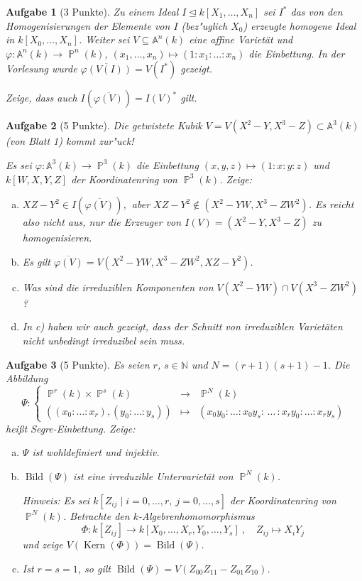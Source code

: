 \documentclass[a4paper, 12pt, numbers=noendperiod, chapterprefix=true]{scrbook}
\theoremstyle{break}
\newtheorem{Aufg}{Aufgabe}
\theoremstyle{nonumberbreak}
\theoremstyle{nonumberplain}
\DeclareMathOperator{\Bild}{Bild}
\DeclareMathOperator{\Kern}{Kern}
\newcommand{\N}{\mathbb{N}}
\newcommand{\A}{\mathbb{A}}
\newcommand{\Affine}{\mathbb{A}} %
\DeclareMathOperator{\Projective}{\mathbb{P}} %
\newcommand{\ideal}{\unlhd}
\begin{document}
\begin{Aufg}[3 Punkte]
Zu einem Ideal $I\ideal k[X_1,\dots,X_n]$ sei $I^*$ das von den Homogenisierungen der Elemente von $I$ (bez"uglich $X_0$) erzeugte homogene Ideal in $k[X_0,\dots,X_n]$. Weiter sei $V\subseteq \Affine^n(k)$ eine affine Variet\"at und $\varphi: \Affine^n(k)\to \Projective^n(k)$, $(x_1,\dots,x_n)\mapsto (1:x_1:\ldots:x_n)$ die Einbettung. In der Vorlesung wurde $\overline{\varphi(V(I))} = V(I^*)$ gezeigt.

Zeige, dass auch $I(\overline{\varphi(V)}) = I(V)^*$ gilt.
\end{Aufg}

\begin{Aufg}[5 Punkte]
Die getwistete Kubik $V = V(X^2-Y, X^3-Z) \subset \Affine^3(k)$ (von Blatt 1) kommt zur"uck! 

Es sei $\varphi: \Affine^3(k)\to \Projective^3(k)$ die Einbettung $(x,y,z)\mapsto (1:x:y:z)$ und $k[W,X,Y,Z]$ der Koordinatenring von $\Projective^3(k)$. Zeige:
\begin{enumerate}[a)]
	\item $XZ-Y^2 \in I(\overline{\varphi(V)})$,$\ $ aber $XZ-Y^2\not\in (X^2-YW, X^3-ZW^2)$. Es reicht also nicht aus, nur die Erzeuger von $I(V) = (X^2-Y, X^3-Z)$ zu homogenisieren.
	\item Es gilt $\overline{\varphi(V)} = V(X^2 - YW, X^3-ZW^2, XZ-Y^2)$.
	\item Was sind die irreduziblen Komponenten von $V(X^2 -YW) \cap V(X^3-ZW^2)$?
	\item In c) haben wir auch gezeigt, dass der Schnitt von irreduziblen Variet\"aten nicht unbedingt irreduzibel sein muss.
\end{enumerate}\end{Aufg}

\begin{Aufg}[5 Punkte]
Es seien $r$, $s\in \N$ und $N= (r+1)(s+1) - 1$. Die Abbildung
	\[\Psi: \left\{ \begin{array}{ccc} \Projective^r(k)\times \Projective^s(k) &\to& \Projective^N(k)\\
		((x_0:\ldots:x_r),(y_0:\ldots:y_s)) &\mapsto& (x_0y_0:\ldots:x_0y_s:\, \ldots\, : x_ry_0: \ldots :x_ry_s ) 
		\end{array}
	\right.\]
hei\ss t \textit{Segre-Einbettung}. Zeige:
\begin{enumerate}[a)]
	\item $\Psi$ ist wohldefiniert und injektiv.
	\item $\Bild(\Psi)$ ist eine irreduzible Untervariet\"at von $\Projective^N(k)$.
 
	\emph{Hinweis: Es sei $k[Z_{ij}\mid i=0,\dots,r,\ j=0,\dots,s]$ der Koordinatenring von $\Projective^N(k)$. Betrachte den $k$-Algebrenhomomorphismus
		\[\Phi:k[Z_{ij}]\to k[X_0,\dots,X_r,Y_0,\dots,Y_s]\ ,\quad Z_{ij}\mapsto X_iY_j\]
	und zeige $V(\Kern(\Phi)) = \Bild(\Psi)$.}
	\item Ist $r=s=1$, so gilt $\Bild(\Psi) = V(Z_{00}Z_{11}-Z_{01}Z_{10})$.
\end{enumerate}\end{Aufg}
\end{document}
